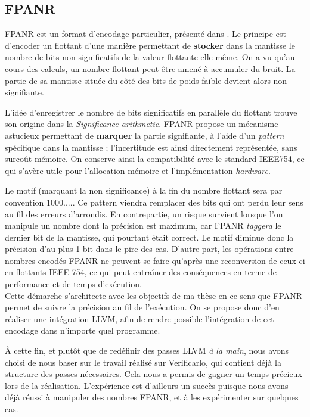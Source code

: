 \documentclass[a4paper,11pt]{article}
\begin{document}
\subsection{ FPANR }
FPANR est un format d'encodage particulier, présenté dans \cite{defour2018fp}.
Le principe est d'encoder un flottant d'une manière permettant de \textbf{stocker} dans la mantisse le nombre de bits non significatifs de la valeur flottante elle-même.
On a vu qu’au cours des calculs, un nombre flottant peut être amené à accumuler du bruit. La partie de sa mantisse située du côté des bits de poids faible devient alors non signifiante.

L'idée d'enregistrer le nombre de bits significatifs en parallèle du flottant trouve son origine dans la \textit{Significance arithmetic}\cite{goldstein1963significance}.
FPANR propose un mécanisme astucieux permettant de \textbf{marquer} la partie signifiante, à l'aide d'un \textit{pattern} spécifique dans la mantisse ; l'incertitude est ainsi directement représentée, sans surcoût mémoire.
On conserve ainsi la compatibilité avec le standard IEEE754, ce qui s'avère utile pour l’allocation mémoire et l’implémentation \textit{hardware}.

Le motif (marquant la non significance) à la fin du nombre flottant sera par convention $1000....$. Ce pattern viendra remplacer des bits qui ont perdu leur sens au fil des erreurs d'arrondis. En contrepartie, un risque survient lorsque l'on manipule un nombre dont la précision est maximum, car FPANR \textit{taggera} le dernier bit de la mantisse, qui pourtant était correct. Le motif diminue donc la précision d'au plus 1 bit dans le pire des cas. %
D'autre part, les opérations entre nombres encodés FPANR ne peuvent se faire qu’après une reconversion de ceux-ci en flottants IEEE 754, ce qui peut entraîner des conséquences en terme de performance et de temps d’exécution.
\\

Cette démarche s’architecte avec les objectifs de ma thèse en ce sens que FPANR permet de suivre la précision au fil de l’exécution.
On se propose donc d'en réaliser une intégration LLVM, afin de rendre possible l’intégration de cet encodage dans n’importe quel programme.

À cette fin, et plutôt que de redéfinir des passes LLVM \textit{à la main}, nous avons choisi de nous baser sur le travail réalisé sur Verificarlo, qui contient déjà la structure des passes nécessaires.
Cela nous a permis de gagner un temps précieux lors de la réalisation.
L’expérience est d'ailleurs un succès puisque nous avons déjà réussi à manipuler des nombres FPANR, et à les expérimenter sur quelques cas.
\\
\end{document}
